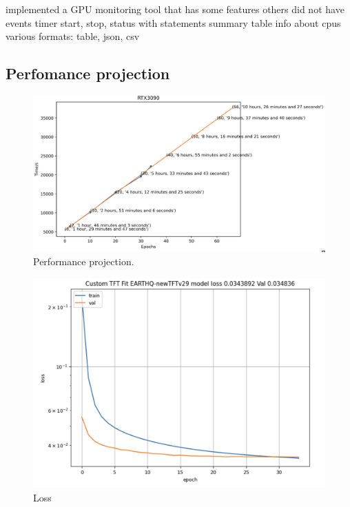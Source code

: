 \documentclass[utf8]{FrontiersinVancouver} %
\begin{document}
implemented a GPU monitoring tool that has some features others did not have 
events
timer start, stop, status
with statements
summary table
info about cpus
various formats: table, json, csv



\subsection{Perfomance projection}



\begin{figure}[htb]
    \centering
    \includegraphics[width=0.70\columnwidth]{images/performance-projection.png}
    \caption{Performance projection. }
    \label{fig:performance-projection}
\end{figure}


\begin{figure}[htb]
    \centering
    \includegraphics[width=0.70\columnwidth]{images/loss.png}
    \caption{Loss}
    \label{fig:loss}
  \end{figure}
\end{document}
